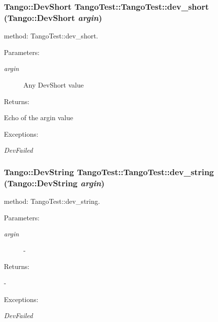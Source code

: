 \subsubsection{\setlength{\rightskip}{0pt plus 5cm}Tango::Dev\-Short Tango\-Test::Tango\-Test::dev\_\-short (Tango::Dev\-Short {\em argin})}\label{classTangoTest_1_1TangoTest_z5_5}


method: Tango\-Test::dev\_\-short.

\begin{Desc}
\item[Parameters: ]\par
\begin{description}
\item[{\em 
argin}]Any Dev\-Short value \end{description}
\end{Desc}
\begin{Desc}
\item[Returns: ]\par
Echo of the argin value \end{Desc}
\begin{Desc}
\item[Exceptions: ]\par
\begin{description}
\item[{\em 
Dev\-Failed}] \end{description}
\end{Desc}
\subsubsection{\setlength{\rightskip}{0pt plus 5cm}Tango::Dev\-String Tango\-Test::Tango\-Test::dev\_\-string (Tango::Dev\-String {\em argin})}\label{classTangoTest_1_1TangoTest_z5_11}


method: Tango\-Test::dev\_\-string.

\begin{Desc}
\item[Parameters: ]\par
\begin{description}
\item[{\em 
argin}]- \end{description}
\end{Desc}
\begin{Desc}
\item[Returns: ]\par
- \end{Desc}
\begin{Desc}
\item[Exceptions: ]\par
\begin{description}
\item[{\em 
Dev\-Failed}] \end{description}
\end{Desc}
